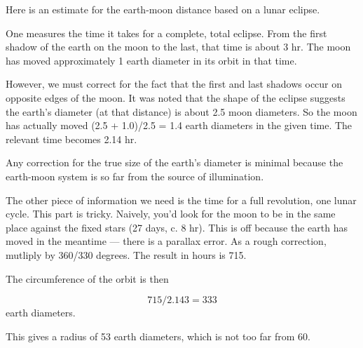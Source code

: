 \documentclass[11pt, oneside]{article}
\begin{document}
Here is an estimate for the earth-moon distance based on a lunar eclipse.

One measures the time it takes for a complete, total eclipse.  From the first shadow of the earth on the moon to the last, that time is about 3 hr.  The moon has moved approximately 1 earth diameter in its orbit in that time.

However, we must correct for the fact that the first and last shadows occur on opposite edges of the moon.  It was noted that the shape of the eclipse suggests the earth's diameter (at that distance) is about 2.5 moon diameters.  So the moon has actually moved (2.5 + 1.0)/2.5 = 1.4 earth diameters in the given time.  The relevant time becomes 2.14 hr.

Any correction for the true size of the earth's diameter is minimal because the earth-moon system is so far from the source of illumination.

The other piece of information we need is the time for a full revolution, one lunar cycle.  This part is tricky.  Naively, you'd look for the moon to be in the same place against the fixed stars (27 days, c. 8 hr).  This is off because the earth has moved in the meantime --- there is a parallax error.  As a rough correction, mutliply by 360/330 degrees.  The result in hours is 715.

The circumference of the orbit is then

\[ 715 / 2.143 = 333 \]
earth diameters.

This gives a radius of 53 earth diameters, which is not too far from 60.
\end{document}
